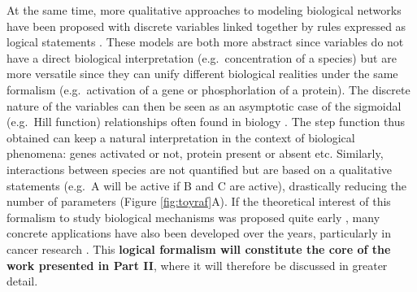 \documentclass[a4paper,12pt,twoside,onecolumn,openright,final,oldfontcommands]{memoir}
\begin{document}
At the same time, more qualitative approaches to modeling biological
networks have been proposed with discrete variables linked together by
rules expressed as logical statements \citep{abou2016logical}. These
models are both more abstract since variables do not have a direct
biological interpretation (e.g.~concentration of a species) but are more
versatile since they can unify different biological realities under the
same formalism (e.g.~activation of a gene or phosphorlation of a
protein). The discrete nature of the variables can then be seen as an
asymptotic case of the sigmoidal (e.g.~Hill function) relationships
often found in biology \citep{le2015quantitative}. The step function
thus obtained can keep a natural interpretation in the context of
biological phenomena: genes activated or not, protein present or absent
etc. Similarly, interactions between species are not quantified but are
based on a qualitative statements (e.g.~A will be active if B and C are
active), drastically reducing the number of parameters (Figure
\ref{fig:toyraf}A). If the theoretical interest of this formalism to
study biological mechanisms was proposed quite early
\citep{kauffman1969homeostasis, thomas1973boolean}, many concrete
applications have also been developed over the years, particularly in
cancer research \citep{saez2011comparing, remy2015modeling}. This
\textbf{logical formalism will constitute the core of the work presented
in Part II}, where it will therefore be discussed in greater detail.
\end{document}
